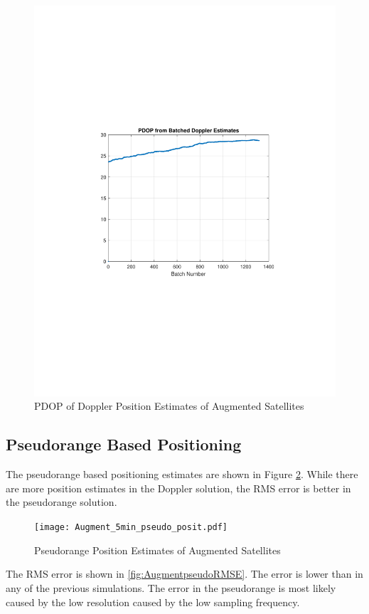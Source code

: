 \documentclass[12pt]{report}
\begin{document}
\begin{figure}[h!]
    \centering
    \includegraphics[trim=1.2in 3.3in 1.75in 3.3in,clip,width=5in]
    {Augment_5min_Doppler_PDOP.pdf}
    \caption{PDOP of Doppler Position Estimates of Augmented Satellites}
    \label{fig:AugmentdopplerPDOP}
\end{figure}

\subsection{Pseudorange Based Positioning}
The pseudorange based positioning estimates are shown in Figure \ref{fig:Augmentpseudoposit}. While there are more position estimates in the Doppler solution, the RMS error is better in the pseudorange solution.
\begin{figure}[h!]
    \centering
    \texttt{[image: Augment\_5min\_pseudo\_posit.pdf]}
    \caption{Pseudorange Position Estimates of Augmented Satellites}
    \label{fig:Augmentpseudoposit}
\end{figure}
The RMS error is shown in \ref{fig:AugmentpseudoRMSE}. The error is lower than in any of the previous simulations. The error in the pseudorange is most likely caused by the low resolution caused by the low sampling frequency. 
\end{document}
